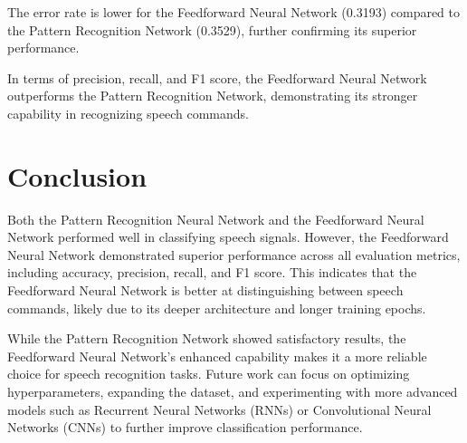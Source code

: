 \documentclass[a4paper,12pt]{article}
\begin{document}
The error rate is lower for the Feedforward Neural Network (0.3193) compared to the Pattern Recognition Network (0.3529), further confirming its superior performance.

In terms of precision, recall, and F1 score, the Feedforward Neural Network outperforms the Pattern Recognition Network, demonstrating its stronger capability in recognizing speech commands.
\section{Conclusion}
Both the Pattern Recognition Neural Network and the Feedforward Neural Network performed well in classifying speech signals. However, the Feedforward Neural Network demonstrated superior performance across all evaluation metrics, including accuracy, precision, recall, and F1 score. This indicates that the Feedforward Neural Network is better at distinguishing between speech commands, likely due to its deeper architecture and longer training epochs.

While the Pattern Recognition Network showed satisfactory results, the Feedforward Neural Network's enhanced capability makes it a more reliable choice for speech recognition tasks. Future work can focus on optimizing hyperparameters, expanding the dataset, and experimenting with more advanced models such as Recurrent Neural Networks (RNNs) or Convolutional Neural Networks (CNNs) to further improve classification performance.
\end{document}

